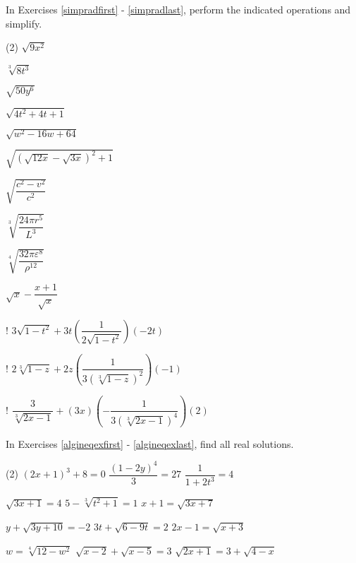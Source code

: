 \label{ExercisesforAppRadEqus}

In Exercises \ref{simpradfirst} - \ref{simpradlast}, perform the indicated operations and simplify.

\begin{tasks}(2)
\task   $\sqrt{9x^2}$ \label{simpradfirst}

\task   $\sqrt[3]{8t^3}$

\task   $\sqrt{50y^6}$

\task  $\sqrt{4t^2 + 4t + 1}$

\task  $\sqrt{w^2 - 16w + 64}$

\task  $\sqrt{(\sqrt{12x} - \sqrt{3x})^2+1}$

\task  $\sqrt{\dfrac{c^2 - v^2}{c^2}}$

\task  $\sqrt[3]{\dfrac{24 \pi r^5}{L^3}}$

\task   $\sqrt[4]{\dfrac{32 \pi \varepsilon^8}{\rho^{12}}}$    

\task $\sqrt{x} - \dfrac{x+1}{\sqrt{x}}$

\task! $3 \sqrt{1-t^2} + 3t\left(\dfrac{1}{2 \sqrt{1-t^2}}\right)(-2t)$

\task! $2 \sqrt[3]{1-z} + 2z \left(\dfrac{1}{3 \left(\sqrt[3]{1-z}\right)^2}\right)(-1)$


\task!  $\dfrac{3}{\sqrt[3]{2x-1}} + (3x)\left(-\dfrac{1}{3 \left(\sqrt[3]{2x-1} \right)^4}\right)(2)$  \label{simpradlast}

\end{tasks}



In Exercises \ref{algineqexfirst} - \ref{algineqexlast}, find all real solutions.

\begin{tasks}[resume](2)
\task  $(2x+1)^3 + 8 = 0$ \label{algineqexfirst} 
\task $\dfrac{(1-2y)^{4}}{3} = 27$ 
\task  $\dfrac{1}{1 + 2t^3} = 4$ 

\task $\sqrt{3x+1} = 4$
\task $5 - \sqrt[3]{t^2+1} = 1$
\task $x+1 = \sqrt{3x+7}$ %

\task  $y + \sqrt{3y+10} = -2$ %
\task  $3t+\sqrt{6-9t}=2$ %
\task $2x - 1 = \sqrt{x + 3}$ %


\task $w = \sqrt[4]{12-w^2}$
\task $\sqrt{x - 2} + \sqrt{x - 5} = 3$ %
\task $\sqrt{2x+1} = 3 + \sqrt{4-x}$  \label{algineqexlast} %

\end{tasks}

